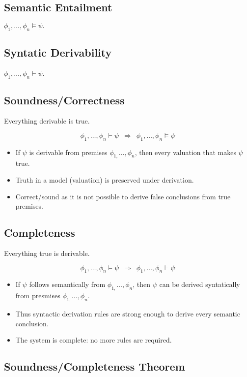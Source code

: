 \documentclass{article}
\begin{document}
\subsection*{Semantic Entailment}

$\phi_{1},\ldots,\phi_{n}\vDash\psi.$

\subsection{Syntatic Derivability}

$\phi_{1},\ldots,\phi_{n}\vdash\psi$.

\subsection{Soundness/Correctness}

Everything derivable is true.

\[
\phi_{1},\ldots,\phi_{n}\vdash\psi\,\,\,\Longrightarrow\,\,\,\phi_{1},\ldots,\phi_{n}\vDash\psi
\]
\begin{itemize}
    \item If $\psi$ is derivable from premises $\phi_{1,}\ldots,\phi_{n}$, then every valuation that makes $\psi$ true.
    \item Truth in a model (valuation) is preserved under derivation.
    \item Correct/sound as it is not possible to derive false conclusions from true premises.
\end{itemize}

\subsection{Completeness}

Everything true is derivable.

\[
\phi_{1},\ldots,\phi_{n}\vDash\psi\,\,\,\Longrightarrow\,\,\,\phi_{1},\ldots,\phi_{n}\vdash\psi
\]
\begin{itemize}
    \item If $\psi$ follows semantically from $\phi_{1,}\ldots,\phi_{n}$, then $\psi$ can be derived syntatically from presmises $\phi_{1,}\ldots,\phi_{n}$.
    \item Thus syntactic derivation rules are strong enough to derive every semantic conclusion.
    \item The system is complete: no more rules are required.
\end{itemize}

\subsection{Soundness/Completeness Theorem}
\end{document}
